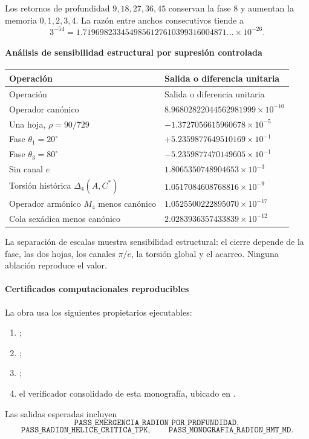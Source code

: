 Los retornos de profundidad \(9,18,27,36,45\) conservan la fase \(8\) y
aumentan la memoria \(0,1,2,3,4\). La razón entre anchos consecutivos tiende
a
\[
3^{-54}=1.7196982334549856127610399316004871\ldots\times10^{-26}.
\]

\paragraph{Análisis de sensibilidad estructural por supresión controlada}

\begin{longtable}{p{} p{}}
\toprule
Operación & Salida o diferencia unitaria\\
\midrule
\endfirsthead
\toprule
Operación & Salida o diferencia unitaria\\
\midrule
\endhead
Operador canónico & \(8.96802822044562981999\times10^{-10}\)\\
Una hoja, \(\rho=90/729\) & \(-1.3727056615960678\times10^{-5}\)\\
Fase \(\theta_1=20^\circ\) & \(+5.2359877649510169\times10^{-1}\)\\
Fase \(\theta_3=80^\circ\) & \(-5.2359877470149605\times10^{-1}\)\\
Sin canal \(e\) & \(1.8065350748904653\times10^{-3}\)\\
Torsión histórica \(\Delta_4(A,C^*)\) & \(1.0517084608768816\times10^{-9}\)\\
Operador armónico \(M_4\) menos canónico & \(1.0525500222895070\times10^{-17}\)\\
Cola sexádica menos canónico & \(2.0283936357433839\times10^{-12}\)\\
\bottomrule
\end{longtable}

La separación de escalas muestra sensibilidad estructural: el cierre depende
de la fase, las dos hojas, los canales \(\pi/e\), la torsión global y el acarreo.
Ninguna ablación reproduce el valor.

\paragraph{Certificados computacionales reproducibles}

La obra usa los siguientes propietarios ejecutables:
\begin{enumerate}
\item {};
\item {};
\item {};
\item el verificador consolidado de esta monografía, ubicado en
.
\end{enumerate}
Las salidas esperadas incluyen
\[
\texttt{PASS\_EMERGENCIA\_RADION\_POR\_PROFUNDIDAD},
\]
\[
\texttt{PASS\_RADION\_HELICE\_CRITICA\_TPK},
\qquad
\texttt{PASS\_MONOGRAFIA\_RADION\_HMT\_MD}.
\]

